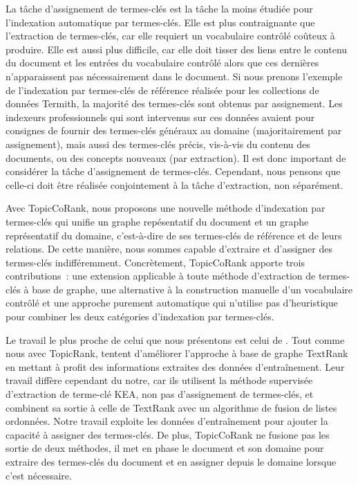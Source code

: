     La tâche d'assignement de termes-clés est la tâche la moins étudiée pour
    l'indexation automatique par termes-clés. Elle est plus contraignante que
    l'extraction de termes-clés, car elle requiert un vocabulaire contrôlé
    coûteux à produire. Elle est aussi plus difficile, car elle doit tisser des
    liens entre le contenu du document et les entrées du vocabulaire contrôlé
    alors que ces dernières n'apparaissent pas nécessairement dans le document.
    Si nous prenons l'exemple de l'indexation par termes-clés de référence
    réalisée pour les collections de données Termith, la majorité des
    termes-clés sont obtenus par assignement. Les indexeurs professionnels qui
    sont intervenus sur ces données avaient pour consignes de fournir des
    termes-clés généraux au domaine (majoritairement par assignement), mais
    aussi  des termes-clés précis, vis-à-vis du contenu des documents, ou des
    concepts nouveaux (par extraction). Il est donc important de considérer la
    tâche d'assignement de termes-clés. Cependant, nous pensons que celle-ci
    doit être réalisée conjointement à la tâche d'extraction, non séparément.

    Avec TopicCoRank, nous proposons une nouvelle méthode d'indexation par
    termes-clés qui unifie un graphe repésentatif du document et un graphe
    représentatif du domaine, c'est-à-dire de ses termes-clés de référence et de
    leurs relations. De cette manière, nous sommes capable d'extraire et
    d'assigner des termes-clés indifféremment. Concrètement, TopicCoRank apporte
    trois contributions~: une extension applicable à toute méthode d'extraction
    de termes-clés à base de graphe, une alternative à la construction manuelle
    d'un vocabulaire contrôlé et une approche purement automatique qui n'utilise
    pas d'heuristique pour combiner les deux catégories d'indexation par
    termes-clés.
        
    Le travail le plus proche de celui que nous présentons est celui de
    . Tout comme nous avec TopicRank,
     tentent d'améliorer l'approche à
    base de graphe TextRank en mettant à profit des informations extraites des
    données d'entraînement. Leur travail diffère cependant du notre, car ils
    utilisent la méthode supervisée d'extraction de terme-clé KEA, non pas
    d'assignement de termes-clés, et combinent sa sortie à celle de TextRank
    avec un algorithme de fusion de listes ordonnées. Notre travail exploite les
    données d'entraînement pour ajouter la capacité à assigner des termes-clés.
    De plus, TopicCoRank ne fusione pas les sortie de deux méthodes, il met en
    phase le document et son domaine pour extraire des termes-clés du document
    et en assigner depuis le domaine lorsque c'est nécessaire.

